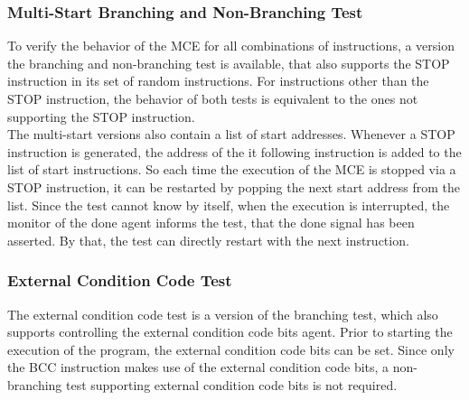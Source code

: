 \subsubsection{Multi-Start Branching and Non-Branching Test}

To verify the behavior of the MCE  for all combinations of instructions, a version the branching and non-branching test is available, that also supports the
STOP instruction in its set of random instructions. For instructions other than the STOP instruction, the behavior of both tests is equivalent to the ones not
supporting the STOP instruction.\\
The multi-start versions also contain a list of start addresses. 
Whenever a STOP instruction is generated, the address of the it following instruction is added to the list of start instructions.
So each time the execution of the MCE is stopped via a STOP instruction, it can be restarted by popping the next start address from the list.
Since the test cannot know by itself, when the execution is interrupted, the monitor of the done agent informs the test, that the done signal has been asserted.
By that, the test can directly restart with the next instruction.

\subsubsection{External Condition Code Test}

The external condition code test is a version of the branching test, which also supports controlling the external condition code bits agent.
Prior to starting the execution of the program, the external condition code bits can be set. 
Since only the BCC instruction makes use of the external condition code bits, a non-branching test supporting external condition code bits is not required.
